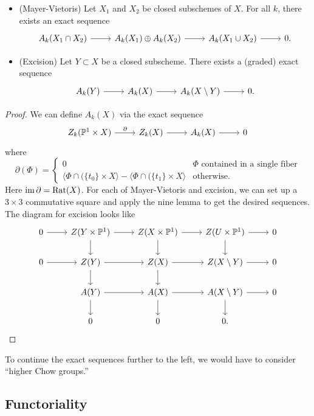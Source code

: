 \documentclass{article}
\begin{document}
\begin{prop}
	\begin{itemize}
		\item (Mayer-Vietoris) Let $X_1$ and $X_2$ be closed subschemes of $X$.
			For all $k$, there exists an exact sequence
			\[
				\begin{tikzcd}
					A_k(X_1 \cap X_2) \rar & A_k(X_1) \oplus A_k(X_2) \rar & A_k(X_1 \cup X_2) \rar & 0.
				\end{tikzcd}
			\]
		\item (Excision) Let $Y \subset X$ be a closed subscheme.
			There exists a (graded) exact sequence
			\[
				\begin{tikzcd}
					A_k(Y) \rar & A_k(X) \rar & A_k(X \setminus Y) \rar & 0.
				\end{tikzcd}
			\]
	\end{itemize}
\end{prop}

\begin{proof}
	We can define $A_k(X)$ via the exact sequence
	\[
		\begin{tikzcd}
			Z_k(\PP^1 \times X) \rar["\partial"] & Z_k(X) \rar & A_k(X) \rar & 0
		\end{tikzcd}
	\]
	where
	\[
		\partial(\Phi) = \begin{cases}
			0 & \Phi \textrm{ contained in a single fiber} \\
			\langle \Phi \cap (\{ t_0 \} \times X \rangle - \langle \Phi \cap (\{ t_1 \} \times X \rangle & \textrm{otherwise.}
		\end{cases}
	\]
	Here $\operatorname{im} \partial = \operatorname{Rat}(X)$.
	For each of Mayer-Vietoris and excision, we can set up a $3 \times 3$ commutative square and apply the nine lemma to get the desired sequences.
	The diagram for excision looks like
	\[
		\begin{tikzcd}
			0 \rar & Z(Y \times \PP^1) \rar \dar & Z(X \times \PP^1) \rar \dar & Z(U \times \PP^1) \rar \dar & 0 \\
			0 \rar & Z(Y) \rar \dar & Z(X) \rar \dar & Z(X \setminus Y) \rar & 0 \\
			& A(Y) \rar \dar & A(X) \rar \dar & A(X \setminus Y) \rar \dar & 0 \\
			& 0 & 0 & 0. &
		\end{tikzcd}
	\]
\end{proof}

To continue the exact sequences further to the left, we would have to consider ``higher Chow groups.''

\subsection{Functoriality}
\end{document}
